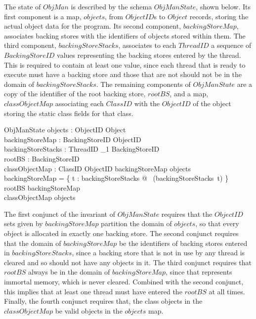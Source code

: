 The state of $ObjMan$ is described by the schema $ObjManState$, shown
below.
Its first component is a map, $objects$, from $ObjectID$s to $Object$
records, storing the actual object data for the program.
Its second component, $backingStoreMap$, associates backing stores
with the identifiers of objects stored within them.
The third component, $backingStoreStacks$, associates to each
$ThreadID$ a sequence of $BackingStoreID$ values representing the
backing stores entered by the thread.
This is required to contain at least one value, since each thread that
is ready to execute must have a backing store and those that are not
should not be in the domain of $backingStoreStacks$.
The remaining components of $ObjManState$ are a copy of the identifier
of the root backing store, $rootBS$, and a map, $classObjectMap$
associating each $ClassID$ with the $ObjectID$ of the object storing
the static class fields for that class.
\begin{schema}{ObjManState}
  objects : ObjectID \pfun Object \\
  backingStoreMap : BackingStoreID \pfun \finset ObjectID \\
  backingStoreStacks : ThreadID \pfun \seq_1 BackingStoreID \\
  rootBS : BackingStoreID \\
  classObjectMap : ClassID \pfun ObjectID
\where
  backingStoreMap \partition \dom objects \\
  \dom backingStoreMap = \bigcup \{ t : \dom backingStoreStacks @ \ran~(backingStoreStacks~t) \} \\
  rootBS \in \dom backingStoreMap \\
  \ran classObjectMap \subseteq \dom objects
\end{schema}
The first conjunct of the invariant of $ObjManState$ requires that the
$ObjectID$ sets given by $backingStoreMap$ partition the domain of
$objects$, so that every object is allocated in exactly one backing
store.
The second conjunct requires that the domain of $backingStoreMap$ be
the identifiers of backing stores entered in $backingStoreStacks$,
since a backing store that is not in use by any thread is cleared and
so should not have any objects in it.
The third conjunct requires that $rootBS$ always be in the domain of
$backingStoreMap$, since that represents immortal memory, which is
never cleared.
Combined with the second conjunct, this implies that at least one
thread must have entered the $rootBS$ at all times.
Finally, the fourth conjunct requires that, the class objects in the
$classObjectMap$ be valid objects in the $objects$ map.

